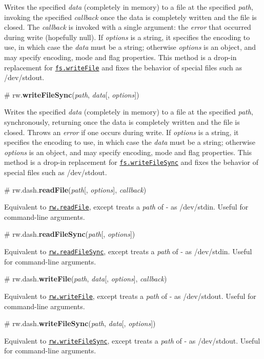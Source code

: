 Writes the specified {\itshape data} (completely in memory) to a file at the specified {\itshape path}, invoking the specified {\itshape callback} once the data is completely written and the file is closed. The {\itshape callback} is invoked with a single argument\+: the {\itshape error} that occurred during write (hopefully null). If {\itshape options} is a string, it specifies the encoding to use, in which case the {\itshape data} must be a string; otherwise {\itshape options} is an object, and may specify encoding, mode and flag properties. This method is a drop-\/in replacement for \href{https://nodejs.org/api/fs.html#fs_fs_writefile_file_data_options_callback}{\tt fs.\+write\+File} and fixes the behavior of special files such as /dev/stdout.

\label{_writeFileSync}%
\# rw.{\bfseries write\+File\+Sync}({\itshape path}, {\itshape data}\mbox{[}, {\itshape options}\mbox{]})

Writes the specified {\itshape data} (completely in memory) to a file at the specified {\itshape path}, synchronously, returning once the data is completely written and the file is closed. Throws an {\itshape error} if one occurs during write. If {\itshape options} is a string, it specifies the encoding to use, in which case the {\itshape data} must be a string; otherwise {\itshape options} is an object, and may specify encoding, mode and flag properties. This method is a drop-\/in replacement for \href{https://nodejs.org/api/fs.html#fs_fs_writefilesync_file_data_options}{\tt fs.\+write\+File\+Sync} and fixes the behavior of special files such as /dev/stdout.

\label{_dash_readFile}%
\# rw.\+dash.{\bfseries read\+File}({\itshape path}\mbox{[}, {\itshape options}\mbox{]}, {\itshape callback})

Equivalent to \href{#readFile}{\tt rw.\+read\+File}, except treats a {\itshape path} of {\ttfamily -\/} as {\ttfamily /dev/stdin}. Useful for command-\/line arguments.

\label{_dash_readFileSync}%
\# rw.\+dash.{\bfseries read\+File\+Sync}({\itshape path}\mbox{[}, {\itshape options}\mbox{]})

Equivalent to \href{#readFileSync}{\tt rw.\+read\+File\+Sync}, except treats a {\itshape path} of {\ttfamily -\/} as {\ttfamily /dev/stdin}. Useful for command-\/line arguments.

\label{_dash_writeFile}%
\# rw.\+dash.{\bfseries write\+File}({\itshape path}, {\itshape data}\mbox{[}, {\itshape options}\mbox{]}, {\itshape callback})

Equivalent to \href{#writeFile}{\tt rw.\+write\+File}, except treats a {\itshape path} of {\ttfamily -\/} as {\ttfamily /dev/stdout}. Useful for command-\/line arguments.

\label{_dash_writeFileSync}%
\# rw.\+dash.{\bfseries write\+File\+Sync}({\itshape path}, {\itshape data}\mbox{[}, {\itshape options}\mbox{]})

Equivalent to \href{#writeFileSync}{\tt rw.\+write\+File\+Sync}, except treats a {\itshape path} of {\ttfamily -\/} as {\ttfamily /dev/stdout}. Useful for command-\/line arguments. 